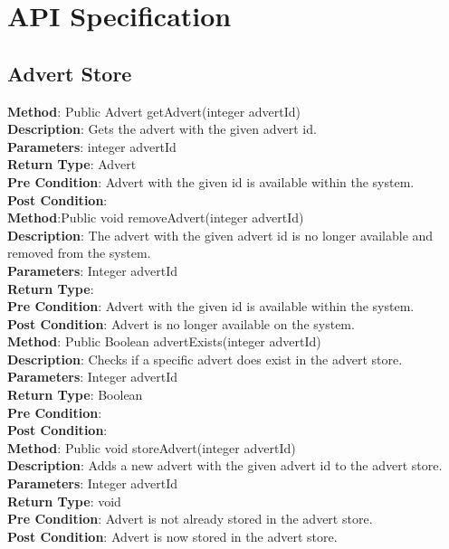 \documentclass{l3deliverable}
\begin{document}

\section{API Specification}


\subsection{Advert Store}

\textbf{Method}: Public Advert getAdvert(integer advertId)\\
\textbf{Description}: Gets the advert with the given advert id.\\
\textbf{Parameters}: integer advertId\\
\textbf{Return Type}: Advert\\
\textbf{Pre Condition}: Advert with the given id is available within the system. \\
\textbf{Post Condition}: \\

\textbf{Method}:Public void removeAdvert(integer advertId)\\
\textbf{Description}: The advert with the given advert id is no longer available and removed from the system.\\
\textbf{Parameters}: Integer advertId\\
\textbf{Return Type}: \\
\textbf{Pre Condition}: Advert with the given id is available within the system.\\
\textbf{Post Condition}: Advert is no longer available on the system.\\

\textbf{Method}: Public Boolean advertExists(integer advertId)\\
\textbf{Description}: Checks if a specific advert does exist in the advert store.\\
\textbf{Parameters}: Integer advertId\\
\textbf{Return Type}: Boolean\\
\textbf{Pre Condition}:\\
\textbf{Post Condition}:\\

\textbf{Method}: Public void storeAdvert(integer advertId)\\
\textbf{Description}: Adds a new advert with the given advert id to the advert store. \\
\textbf{Parameters}: Integer advertId\\
\textbf{Return Type}: void\\
\textbf{Pre Condition}: Advert is not already stored in the advert store.\\
\textbf{Post Condition}: Advert is now stored in the advert store.\\
\end{document}
